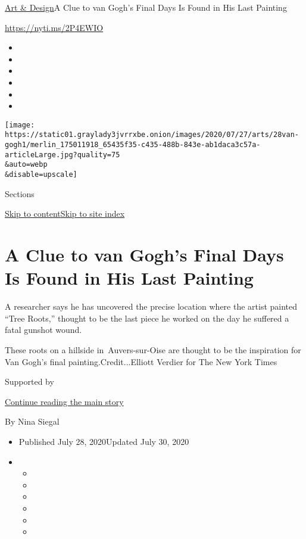 \href{/section/arts/design}{Art \& Design}\textbar{}A Clue to van Gogh's
Final Days Is Found in His Last Painting

\url{https://nyti.ms/2P4EWIO}

\begin{itemize}
\item
\item
\item
\item
\item
\item
\end{itemize}

\texttt{[image: https://static01.graylady3jvrrxbe.onion/images/2020/07/27/arts/28van-gogh1/merlin\_175011918\_65435f35-c435-488b-843e-ab1daca3c57a-articleLarge.jpg?quality=75\\\&auto=webp\\\&disable=upscale]}

Sections

\protect\hyperlink{site-content}{Skip to
content}\protect\hyperlink{site-index}{Skip to site index}

\hypertarget{a-clue-to-van-goghs-final-days-is-found-in-his-last-painting}{%
\section{A Clue to van Gogh's Final Days Is Found in His Last
Painting}\label{a-clue-to-van-goghs-final-days-is-found-in-his-last-painting}}

A researcher says he has uncovered the precise location where the artist
painted ``Tree Roots,'' thought to be the last piece he worked on the
day he suffered a fatal gunshot wound.

These roots on a hillside in~Auvers-sur-Oise are thought to be the
inspiration for Van Gogh's final painting.Credit...Elliott Verdier for
The New York Times

Supported by

\protect\hyperlink{after-sponsor}{Continue reading the main story}

By Nina Siegal

\begin{itemize}
\item
  Published July 28, 2020Updated July 30, 2020
\item
  \begin{itemize}
  \item
  \item
  \item
  \item
  \item
  \item
  \end{itemize}
\end{itemize}

